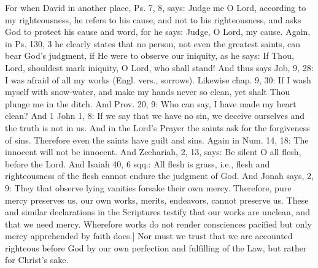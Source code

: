 For when David in another place, Ps. 7, 8, says: Judge me O Lord,
according to my righteousness, he refers to his cause, and not to his
righteousness, and asks God to protect his cause and word, for he
says: Judge, O Lord, my cause.  Again, in Ps. 130, 3 he clearly
states that no person, not even the greatest saints, can bear God's
judgment, if He were to observe our iniquity, as he says: If Thou,
Lord, shouldest mark iniquity, O Lord, who shall stand!  And thus
says Job, 9, 28: I was afraid of all my works (Engl. vers., sorrows).
Likewise chap. 9, 30: If I wash myself with snow-water, and make my
hands never so clean, yet shalt Thou plunge me in the ditch.  And
Prov. 20, 9: Who can say, I have made my heart clean?  And 1 John 1,
8: If we say that we have no sin, we deceive ourselves and the truth
is not in us.  And in the Lord's Prayer the saints ask for the
forgiveness of sins.  Therefore even the saints have guilt and sins.
Again in Num. 14, 18: The innocent will not be innocent.  And
Zechariah, 2, 13, says: Be silent O all flesh, before the Lord.  And
Isaiah 40, 6 sqq.: All flesh is grass, i.e., flesh and righteousness
of the flesh cannot endure the judgment of God.  And Jonah says, 2, 9:
They that observe lying vanities forsake their own mercy.  Therefore,
pure mercy preserves us, our own works, merits, endeavors, cannot
preserve us.  These and similar declarations in the Scriptures
testify that our works are unclean, and that we need mercy.
Wherefore works do not render consciences pacified but only mercy
apprehended by faith does.] Nor must we trust that we are accounted
righteous before God by our own perfection and fulfilling of the Law,
but rather for Christ's sake.

